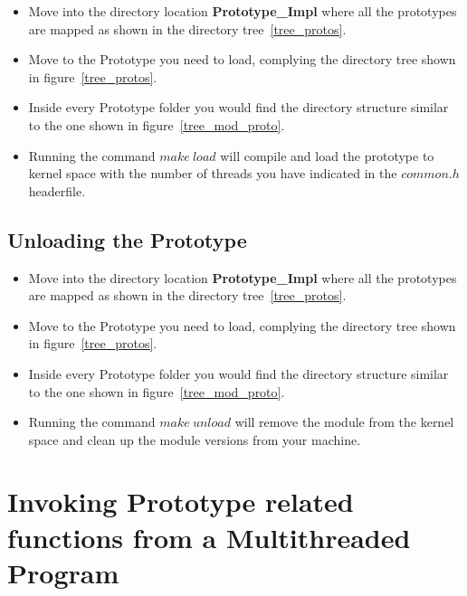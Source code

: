 \documentclass[12pt]{article}
\begin{document}
\begin{itemize}
\item Move into the directory location \textbf{Prototype\_Impl} where all the prototypes are mapped as shown in the directory tree~\ref{tree_protos}. 
\item Move to the Prototype you need to load, complying the directory tree shown in figure~\ref{tree_protos}. 
\item Inside every Prototype folder you would find the directory structure similar to the one shown in figure~\ref{tree_mod_proto}.
\item Running the command $make\ load$ will compile and load the prototype to kernel space with the number of threads you have indicated in the $common.h$ headerfile. 
\end{itemize}

\subsection*{Unloading the Prototype}

\begin{itemize}
\item Move into the directory location \textbf{Prototype\_Impl} where all the prototypes are mapped as shown in the directory tree~\ref{tree_protos}. 
\item Move to the Prototype you need to load, complying the directory tree shown in figure~\ref{tree_protos}. 
\item Inside every Prototype folder you would find the directory structure similar to the one shown in figure~\ref{tree_mod_proto}.
\item Running the command $make\ unload$ will remove the module from the kernel space and clean up the module versions from your machine. 
\end{itemize}

\section*{Invoking Prototype related functions from a Multithreaded Program}
\end{document}
